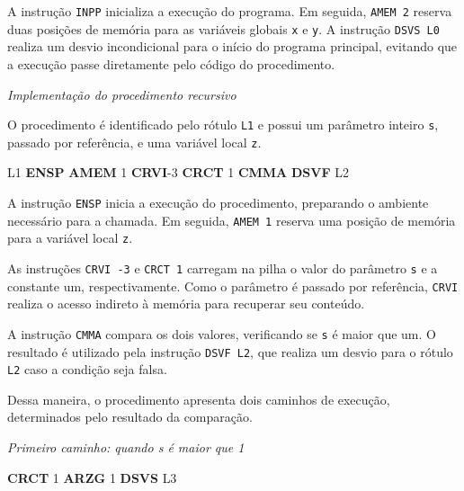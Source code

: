 \documentclass[
  brazilian,
  letterpaper,
]{book}
\newenvironment{Shaded}{\begin{snugshade}}{\end{snugshade}}
\newcommand{\DecValTok}[1]{\textcolor[rgb]{0.68,0.00,0.00}{#1}}
\newcommand{\FunctionTok}[1]{\textcolor[rgb]{0.28,0.35,0.67}{#1}}
\newcommand{\KeywordTok}[1]{\textcolor[rgb]{0.00,0.23,0.31}{\textbf{#1}}}
\newcommand{\NormalTok}[1]{\textcolor[rgb]{0.00,0.23,0.31}{#1}}
\theoremstyle{plain}
\theoremstyle{definition}
\theoremstyle{remark}
\begin{document}
A instrução \texttt{INPP} inicializa a execução do programa. Em seguida,
\texttt{AMEM\ 2} reserva duas posições de memória para as variáveis
globais \texttt{x} e \texttt{y}. A instrução \texttt{DSVS\ L0} realiza
um desvio incondicional para o início do programa principal, evitando
que a execução passe diretamente pelo código do procedimento.

\emph{Implementação do procedimento recursivo}

O procedimento é identificado pelo rótulo \texttt{L1} e possui um
parâmetro inteiro \texttt{s}, passado por referência, e uma variável
local \texttt{z}.

\begin{Shaded}
\begin{Highlighting}[]
\FunctionTok{L1}  \KeywordTok{ENSP}
    \KeywordTok{AMEM}    \DecValTok{1}
    \KeywordTok{CRVI}\NormalTok{    {-}}\DecValTok{3}
    \KeywordTok{CRCT}    \DecValTok{1}
    \KeywordTok{CMMA}
    \KeywordTok{DSVF}    \FunctionTok{L2}
\end{Highlighting}
\end{Shaded}

A instrução \texttt{ENSP} inicia a execução do procedimento, preparando
o ambiente necessário para a chamada. Em seguida, \texttt{AMEM\ 1}
reserva uma posição de memória para a variável local \texttt{z}.

As instruções \texttt{CRVI\ -3} e \texttt{CRCT\ 1} carregam na pilha o
valor do parâmetro \texttt{s} e a constante um, respectivamente. Como o
parâmetro é passado por referência, \texttt{CRVI} realiza o acesso
indireto à memória para recuperar seu conteúdo.

A instrução \texttt{CMMA} compara os dois valores, verificando se
\texttt{s} é maior que um. O resultado é utilizado pela instrução
\texttt{DSVF\ L2}, que realiza um desvio para o rótulo \texttt{L2} caso
a condição seja falsa.

Dessa maneira, o procedimento apresenta dois caminhos de execução,
determinados pelo resultado da comparação.

\emph{Primeiro caminho: quando s é maior que 1}

\begin{Shaded}
\begin{Highlighting}[]
    \KeywordTok{CRCT}    \DecValTok{1}
    \KeywordTok{ARZG}    \DecValTok{1}
    \KeywordTok{DSVS}    \FunctionTok{L3}
\end{Highlighting}
\end{Shaded}
\end{document}
